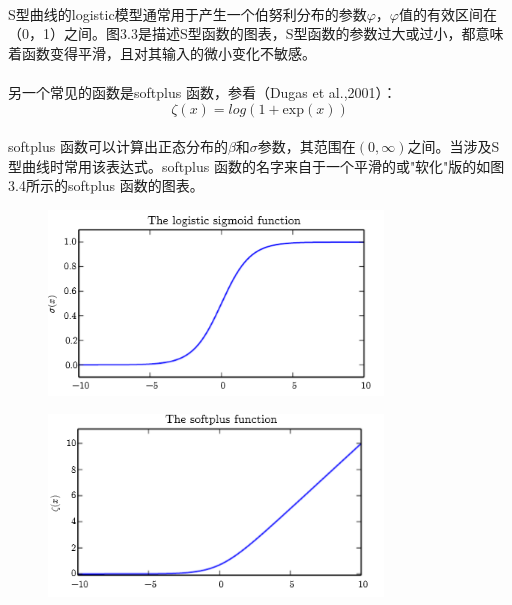 \documentclass{article}
\begin{document}
    \paragraph{}
    S型曲线的logistic模型通常用于产生一个伯努利分布的参数$\varphi$，$\varphi$值的有效区间在（0，1）之间。图3.3是描述S型函数的图表，S型函数的参数过大或过小，都意味着函数变得平滑，且对其输入的微小变化不敏感。
    \paragraph{}
    另一个常见的函数是softplus 函数，参看（Dugas et al.,2001）：
    \begin{equation}
    \zeta(x)=log(1+\mathrm{exp}(x))   \tag{3.31}
    \end{equation}
    \paragraph{}
    softplus 函数可以计算出正态分布的$\beta$和$\sigma$参数，其范围在$(0,\infty)$之间。当涉及S型曲线时常用该表达式。softplus 函数的名字来自于一个平滑的或"软化"版的如图3.4所示的softplus 函数的图表。
    \begin{figure}[!htb]
    \centering
   \centerline{\includegraphics[width=3.5in]{fig/chap3/3_3.png}}
   \label*{图:3.3}
   \end{figure}
    \begin{figure}[!htb]
    \centering
   \centerline{\includegraphics[width=3.5in]{fig/chap3/3_4.png}}
   \label*{图:3.4}
   \end{figure}
\end{document}
